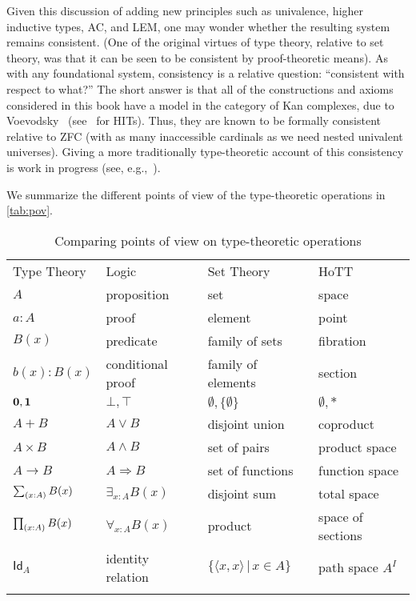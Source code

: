 Given this discussion of adding new principles such as univalence, higher inductive types, AC, and LEM, one may wonder whether the resulting system remains consistent.
(One of the original virtues of type theory, relative to set theory, was that it can be seen to be consistent by proof-theoretic means).
As with any foundational system, consistency is a relative question: ``consistent with respect to what?''
The short answer is that all of the constructions and axioms considered in this book have a model in the category of Kan complexes, due to Voevodsky~\cite{klv:ssetmodel} (see~\cite{ls:hits} for HITs).
Thus, they are known to be formally consistent relative to ZFC (with as many inaccessible cardinals as we need nested univalent universes).
Giving a more traditionally type-theoretic account of this consistency is work in progress (see,
e.g.,~\cite{lh:canonicity,coquand2012constructive}).

We summarize the different points of view of the type-theoretic operations in \autoref{tab:pov}.

\begin{table}[htb]
  \centering
  \begin{tabular}{llll}
    \toprule
       Type Theory & Logic & Set Theory & HoTT\\ \addlinespace[2pt]
    \midrule
       $A$ & proposition & set & space\\ \addlinespace[2pt]
       $a:A$ & proof & element & point \\ \addlinespace[2pt]
       $B(x)$ & predicate & family of sets & fibration \\ \addlinespace[2pt]
       $b(x) : B(x)$ & conditional proof & family of elements & section\\ \addlinespace[2pt]
       $\mathbf{0}, \mathbf{1}$ & $\bot, \top$ & $\emptyset, \{ \emptyset \}$ & $\emptyset, *$\\ \addlinespace[2pt]
       $A + B$ & $A\vee B$ & disjoint union & coproduct\\ \addlinespace[2pt]
       $A\times B$ & $A\wedge B$ & set of pairs & product space\\ \addlinespace[2pt]
       $A\to B$ & $A\Rightarrow B$ & set of functions & function space\\ \addlinespace[2pt]
       $\sm{x:A}B(x)$ &  $\exists_{x:A}B(x)$ & disjoint sum & total space\\ \addlinespace[2pt]
       $\prd{x:A}B(x)$ &  $\forall_{x:A}B(x)$ & product & space of sections\\ \addlinespace[2pt]
       $\mathsf{Id}_{A}$ & identity relation & $\{\langle x,x\rangle\, |\, x\in A\}$ & path space $A^I$ \\ \addlinespace[2pt]
    \bottomrule
  \end{tabular}
  \caption{Comparing points of view on type-theoretic operations}\label{tab:pov}
\end{table}


